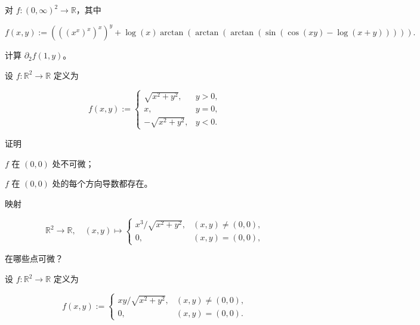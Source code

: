 \begin{exercises}
\item

对 $ f : (0,\infty)^{2} \to \mathbb{R} $，其中

\[
f(x,y) := \left(\left(\left(x^{x}\right)^{x}\right)^{x}\right)^{y} + \log(x)\arctan\left(\arctan\left(\arctan\left(\sin\left(\cos(xy) - \log(x + y)\right)\right)\right)\right) .
\]

计算 $ \partial_{2} f(1,y) $。

\item

设 $ f : \mathbb{R}^{2} \to \mathbb{R} $ 定义为

\begin{equation*}
f(x,y) := \begin{cases} \sqrt{x^{2} + y^{2}} , & y > 0 , \\ x , & y = 0 , \\ -\sqrt{x^{2} + y^{2}} , & y < 0 . \end{cases}
\end{equation*}

证明

\begin{items}
\item

$ f $ 在 $ (0,0) $ 处不可微；

\item

$ f $ 在 $ (0,0) $ 处的每个方向导数都存在。

\end{items}

\item

映射

\begin{equation*}
\mathbb{R}^{2} \to \mathbb{R} , \quad (x,y) \mapsto \begin{cases} x^{3}/\sqrt{x^{2} + y^{2}} , & (x,y) \ne (0,0) , \\ 0 , & (x,y) = (0,0) , \end{cases}
\end{equation*}

在哪些点可微？

\item

设 $ f : \mathbb{R}^{2} \to \mathbb{R} $ 定义为

\begin{equation*}
f(x,y) := \begin{cases} xy/\sqrt{x^{2} + y^{2}} , & (x,y) \ne (0,0) , \\ 0 , & (x,y) = (0,0) . \end{cases}
\end{equation*}


\end{exercises}
